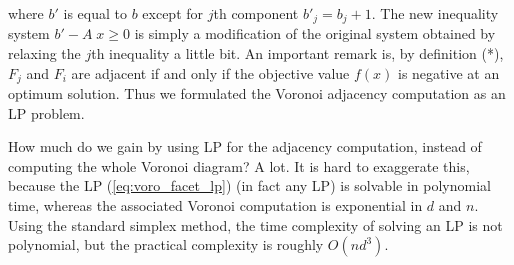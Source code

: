 \documentclass[[a4paper,12pt]{article}
\begin{document}
\noindent
where $b'$ is equal to $b$ except for $j$th component
$b'_j = b_j + 1$.  The new inequality system  $b' - A \; x \ge 0$
is simply a modification of the original system 
obtained by relaxing the $j$th inequality a little bit.
An important remark is, by definition (*), $F_j$ and $F_i$
are adjacent if and only if the objective value $f(x)$
is negative at an optimum solution.  Thus we formulated
the Voronoi adjacency computation as an LP problem.

How much do we gain by using LP for the adjacency computation, instead
of computing the whole Voronoi diagram?
A lot.   It is hard to exaggerate this, because the LP (\ref{eq:voro_facet_lp})
(in fact any LP) is solvable in polynomial time, 
whereas the associated Voronoi computation is exponential in
$d$ and $n$.  Using the standard simplex method, the time complexity of solving
an LP is not polynomial, but the practical complexity is roughly
$O(n  d^3)$.
\end{document}
